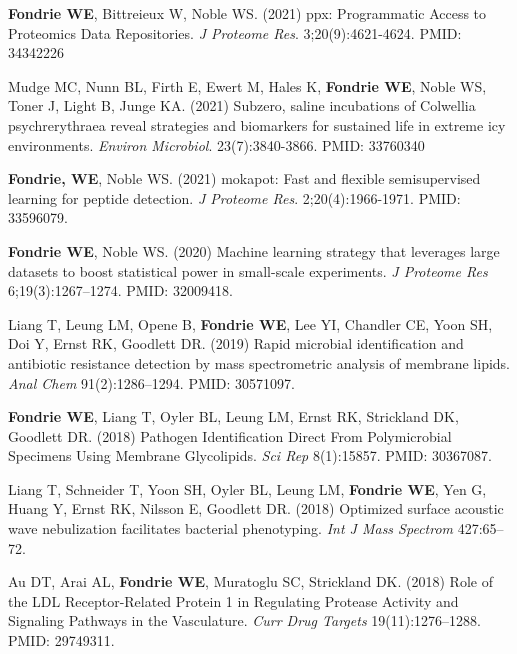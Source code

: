 \documentclass[11pt]{article}
\begin{document}
\begin{etaremune}
  \item \textbf{Fondrie WE}, Bittreieux W, Noble WS. (2021) ppx: Programmatic
  Access to Proteomics Data Repositories. \textit{J Proteome Res}.
  3;20(9):4621-4624. PMID: 34342226

  \item Mudge MC, Nunn BL, Firth E, Ewert M, Hales K, \textbf{Fondrie WE},
  Noble WS, Toner J, Light B, Junge KA. (2021) Subzero, saline incubations of
  Colwellia psychrerythraea reveal strategies and biomarkers for sustained life
  in extreme icy environments. \textit{Environ Microbiol}. 23(7):3840-3866.
  PMID: 33760340

  \item \textbf{Fondrie, WE}, Noble WS. (2021) mokapot: Fast and flexible
  semisupervised learning for peptide detection. \textit{J Proteome Res}.
  2;20(4):1966-1971. PMID: 33596079.

  \item \textbf{Fondrie WE}, Noble WS. (2020) Machine learning strategy that
  leverages large datasets to boost statistical power in small-scale
  experiments. \textit{J Proteome Res} 6;19(3):1267--1274. PMID: 32009418.
  
  \item Liang T, Leung LM, Opene B, \textbf{Fondrie WE}, Lee YI, Chandler CE,
  Yoon SH, Doi Y, Ernst RK, Goodlett DR. (2019) Rapid microbial identification
  and antibiotic resistance detection by mass spectrometric analysis of
  membrane lipids. \textit{Anal Chem} 91(2):1286--1294. PMID: 30571097.

  \item \textbf{Fondrie WE}, Liang T, Oyler BL, Leung LM, Ernst RK, Strickland
  DK, Goodlett DR. (2018) Pathogen Identification Direct From Polymicrobial
  Specimens Using Membrane Glycolipids. \textit{Sci Rep} 8(1):15857. PMID:
  30367087.
    
  \item Liang T, Schneider T, Yoon SH, Oyler BL, Leung LM, \textbf{Fondrie WE},
  Yen G, Huang Y, Ernst RK, Nilsson E, Goodlett DR. (2018) Optimized surface
  acoustic wave nebulization facilitates bacterial phenotyping. \textit{Int J
    Mass Spectrom} 427:65--72.
    
  \item Au DT, Arai AL, \textbf{Fondrie WE}, Muratoglu SC, Strickland DK.
  (2018) Role of the LDL Receptor-Related Protein 1 in Regulating Protease
  Activity and Signaling Pathways in the Vasculature. \textit{Curr Drug
    Targets} 19(11):1276--1288. PMID: 29749311.


\end{etaremune}
\end{document}
